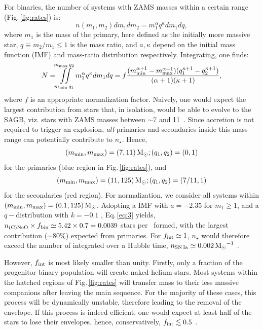 \documentclass[../../main/thesis_msc.tex]{subfiles}
\begin{document}
For binaries, the number of systems with ZAMS masses within a certain range (Fig.\,\ref{fig:rates}) is:
\begin{equation}
n(m_1,m_2)dm_1dm_2 = m_1^{\alpha}q^{\kappa}dm_1dq,
\end{equation}
where $m_1$ is the mass of the primary, here defined as the initially more massive star, 
$q\equiv m_2/m_1\leq 1$ is the mass ratio, and $a,\kappa$ depend on the 
initial mass function (IMF) and mass-ratio distribution respectively. Integrating, one finds:
\begin{equation}\label{eq:3}
\begin{split}
N =  
\iint\limits_{m_{\rm min}\,q_{1}}^{m_{\rm max}\,q_{2}}m_1^{\alpha}q^{\kappa}dm_1dq  
 = f\frac{(m_{\rm min}^{\alpha+1} - m_{\rm max}^{\alpha+1})(q_{1}^{\kappa+1} -  q_{2}^{\kappa+1})}{(\alpha+1)(\kappa+1)}, 
\end{split}
\end{equation}
where $f$ is an appropriate normalization factor. 
Naively, one would expect the largest contribution from stars  that, in isolation, would be able to evolve
to the SAGB, viz. stars with ZAMS masses between $\sim 7$ and 11\msun\ \citep{Farmer:2015afs}. 
Since accretion is not required to trigger an explosion, 
\emph{all} primaries and secondaries inside this mass range 
can potentially contribute to $n_\star$. Hence, $$(m_{\rm min},m_{\rm max})=(7,11)\mathrm{\,M_\odot};(q_1,q_2)=(0,1)$$ for the primaries (blue region in 
Fig.\,\ref{fig:rates}), and $$(m_{\rm min},m_{\rm max})=(11,125)\mathrm{\,M_\odot};(q_1,q_2)=(7/11,1)$$ for the secondaries (red region). For normalization, we consider all systems within $(m_{\rm min},m_{\rm max})=(0.1,125)\mathrm{\,M_\odot}$. Adopting a 
\cite{Chabrier:2004vw} IMF with $a=-2.35$ for $m_1 \ge 1$, and a $q-$distribution with $k=-0.1$ \citep{Sana:2012px},
Eq.\,\ref{eq:3} yields, $n_{\rm \one}\times f_{\rm bin} \simeq 5.42\times 0.7=0.0039$ stars per \msun\ formed, with the largest contribution ($\sim 80\%$) expected from primaries. For $f_{\rm int}\simeq 1$, $n_\star$ would therefore exceed the number of \ia  integrated over a Hubble time, $n_{\rm SN\,Ia}\simeq0.002\mathrm{\,M_\odot}^{-1}$ \citep{Maoz:2013hna}.

However, $f_{\rm int}$ is most likely smaller than unity. Firstly, only a fraction of 
the progenitor binary population will create naked helium stars. Most  systems within the 
hatched regions of Fig.\,\ref{fig:rates} will transfer mass to their less massive 
companions after leaving the main sequence. For the majority of these cases, 
this  process will be  dynamically unstable, therefore leading to the removal of the envelope. If this process is indeed efficient, one would expect at least half of the stars to lose their envelopes, hence, conservatively, $f_{\rm int}\lesssim 0.5$ \citep{Sana:2012px}. 
\end{document}
